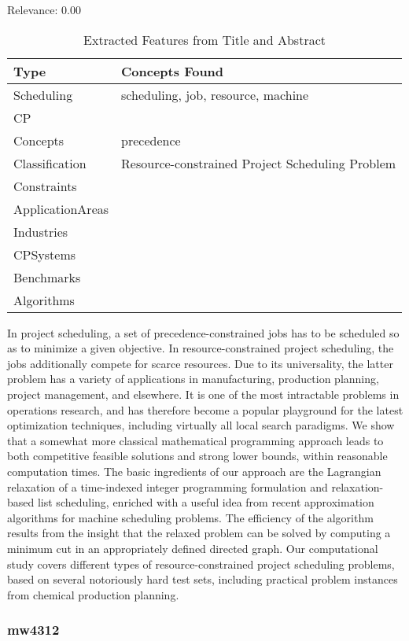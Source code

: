 Relevance:  0.00

{\scriptsize
\begin{longtable}{p{2cm}p{20cm}}
\caption{Extracted Features from Title and Abstract}\\ \toprule
Type & Concepts Found\\ \midrule
\endhead
\bottomrule
\endfoot
Scheduling & scheduling, job, resource, machine\\ 
CP & \\ 
Concepts & precedence\\ 
Classification & Resource-constrained Project Scheduling Problem\\ 
Constraints & \\ 
ApplicationAreas & \\ 
Industries & \\ 
CPSystems & \\ 
Benchmarks & \\ 
Algorithms & \\ 
\end{longtable}
}

  In project scheduling, a set of precedence-constrained jobs has to be scheduled so as to minimize a given objective. In resource-constrained project scheduling, the jobs additionally compete for scarce resources. Due to its universality, the latter problem has a variety of applications in manufacturing, production planning, project management, and elsewhere. It is one of the most intractable problems in operations research, and has therefore become a popular playground for the latest optimization techniques, including virtually all local search paradigms. We show that a somewhat more classical mathematical programming approach leads to both competitive feasible solutions and strong lower bounds, within reasonable computation times. The basic ingredients of our approach are the Lagrangian relaxation of a time-indexed integer programming formulation and relaxation-based list scheduling, enriched with a useful idea from recent approximation algorithms for machine scheduling problems. The efficiency of the algorithm results from the insight that the relaxed problem can be solved by computing a minimum cut in an appropriately defined directed graph. Our computational study covers different types of resource-constrained project scheduling problems, based on several notoriously hard test sets, including practical problem instances from chemical production planning.  

\subsubsection{mw4312}
\label{mw:mw4312}


